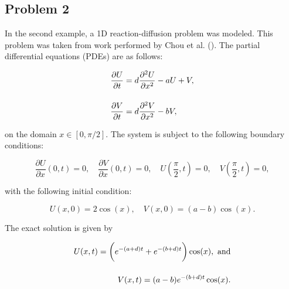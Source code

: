 \FloatBarrier
\clearpage

\subsection{Problem 2}
In the second example, a 1D reaction-diffusion problem was modeled. This problem was taken from work performed by Chou et al. (\cite{ching2007}). The partial differential equations (PDEs) are as follows:

\begin{equation}
\setlength{\jot}{15pt}
\begin{split}
    \frac{\partial U}{\partial t} &= d\frac{\partial^{2}U}{\partial x^{2}} - aU + V, \\
    \frac{\partial V}{\partial t} &=
    d\frac{\partial^{2}V}{\partial x^{2}} - bV,
\end{split}
    \label{eq:problem2Eqs}
\end{equation}

\noindent on the domain $x \in [0, \pi/2]$. The system is subject to the following boundary conditions: 

\begin{equation}
    \frac{\partial U}{\partial x}(0,t) = 0, \quad \frac{\partial V}{\partial x}(0,t) = 0, \quad U(\frac{\pi}{2}, t) = 0, \quad V(\frac{\pi}{2}, t)= 0,
\end{equation}

\noindent with the following initial condition:

\begin{equation}
    U(x,0) = 2\cos(x), \quad V(x,0) = (a-b)\cos(x).
\end{equation}

\noindent The exact solution is given by

\begin{equation}
\setlength{\jot}{15pt}
\begin{split}
    U(x,t) = \bigg( e^{-(a+d)t} + e^{-(b+d)t}\bigg)\cos(x), \text{ and} \\
    V(x,t) = (a - b) e^{-(b+d)t}\cos(x).
\end{split}
\end{equation}

